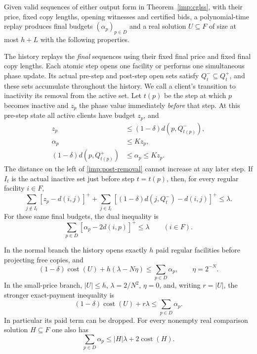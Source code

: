 \begin{lemma}
\label{imp:surplus-history}
Given valid sequences of either output form in Theorem~\ref{imp:cglss},
with their price, fixed copy lengths, opening witnesses and certified bids, a
polynomial-time replay produces final budgets $(\alpha_p)_{p\in D}$
and a real solution $U\subseteq F$ of size at most $h+L$ with the
following properties.

The history replays the \emph{final} sequences using their fixed final
price and fixed final copy lengths.  Each atomic step opens one facility
or performs one simultaneous phase update.  Its actual pre-step and
post-step open sets satisfy
$Q_t^-\subseteq Q_t^+$, and these sets accumulate throughout the
history. We call a client's transition to inactivity its removal from
the active set. Let $t(p)$ be the step at which $p$ becomes inactive and
$z_p$ the phase value immediately \emph{before} that step.  At this
pre-step state all active clients have budget $z_p$, and
\begin{align}
 z_p&\le(1-\delta)d(p,Q_{t(p)}^-),\label{imp:active-threshold}\\
 \alpha_p&\le Kz_p,\label{imp:final-cap}\\
 (1-\delta)d(p,Q_{t(p)}^+)&\le\alpha_p\le Kz_p.
 \label{imp:post-removal}
\end{align}
The distance on the left of \eqref{imp:post-removal} cannot increase
at any later step.  If $I_t$ is the actual inactive set just before
step $t=t(p)$, then, for every regular facility $i\in F$,
\begin{equation}
 \sum_{j\notin I_t}[z_p-d(i,j)]^+
 +\sum_{j\in I_t}[(1-\delta)d(j,Q_t^-)-d(i,j)]^+
 \le\lambda.
 \label{imp:no-overbid}
\end{equation}
For these same final budgets, the dual inequality is
\begin{equation}
 \sum_{p\in D}[\alpha_p-2d(i,p)]^+\le\lambda
 \qquad(i\in F).
 \label{imp:dual}
\end{equation}

In the normal branch the history opens exactly $h$ paid regular
facilities before projecting free copies, and
\begin{equation}
 (1-\delta)\operatorname{cost}(U)+h(\lambda-N\eta)
       \le\sum_{p\in D}\alpha_p,
 \qquad \eta=2^{-N}.
 \label{imp:payment}
\end{equation}
In the small-price branch, $|U|\le h$, $\lambda=2/N^2$, $\eta=0$,
and, writing $r=|U|$, the stronger exact-payment inequality is
\begin{equation}
 (1-\delta)\operatorname{cost}(U)+r\lambda
       \le\sum_{p\in D}\alpha_p.
 \label{imp:small-payment}
\end{equation}
In particular its paid term can be dropped.  For every nonempty real
comparison solution $H\subseteq F$ one also has
\begin{equation}
 \sum_{p\in D}\alpha_p
       \le |H|\lambda+2\operatorname{cost}(H).
 \label{imp:comparison}
\end{equation}
\end{lemma}

